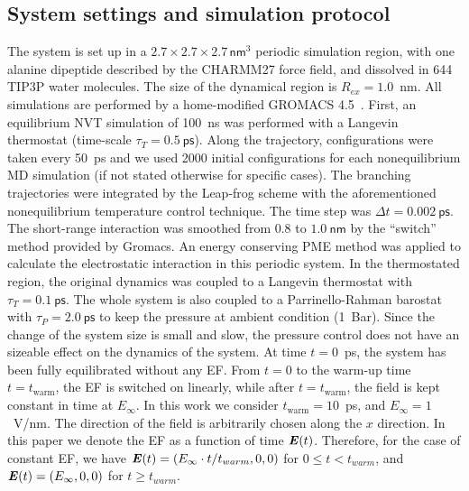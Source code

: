 \documentclass[a4paper,preprint,unsortedaddress,onecolumn]{revtex4-1}
\newcommand{\vect}[1]{\textbf{\textit{#1}}}
\begin{document}
\subsection{System settings and simulation protocol}
The system is set up in a $2.7\times 2.7\times
2.7\, \textsf{nm}^3$ periodic simulation region, with one alanine dipeptide
described by the CHARMM27 force field, and dissolved in 644 TIP3P
water molecules.
The size of the  dynamical region is $R_{ex} = 1.0$~nm.
All simulations are performed by a home-modified GROMACS 4.5~\cite{pronk2013gromacs}.
First, an equilibrium NVT simulation of
100~\textsf{ns} was performed with a Langevin thermostat (time-scale
$\tau_T = 0.5~\textsf{ps}$).  Along the trajectory, configurations were taken every
50~\textsf{ps} and we used 2000 initial configurations for each nonequilibrium
MD simulation (if not stated otherwise for specific cases).
The branching trajectories were integrated by the
Leap-frog scheme with the aforementioned nonequilibrium
temperature control technique.  The
time step was $\Delta t = 0.002~\textsf{ps}$. The short-range
interaction was smoothed from $0.8$ to $1.0~\textsf{nm}$ by the
``switch'' method provided by Gromacs.  An energy conserving PME
method was applied to calculate the electrostatic interaction in this
periodic system. In the thermostated region, the original dynamics was
coupled to a Langevin thermostat with $\tau_T = 0.1~\textsf{ps}$.
The whole system is also coupled to a Parrinello-Rahman barostat~\cite{parrinello1981polymorphic} with $\tau_P = 2.0~\textsf{ps}$ to keep
the pressure at ambient condition (1~Bar). Since the
change of the system size is small and slow, the pressure control
does not have an sizeable effect on the
dynamics of the system.
At time $t=0$~ps, the system
has been fully equilibrated without any EF. From $t=0$ to
the warm-up time $t=t_{\textrm{warm}}$, the EF is switched on linearly, while
after $t=t_{\textrm{warm}}$, the field is kept constant in time at
$E_{\infty}$.  In this work we consider $t_{\textrm{warm}} = 10$~ps,
and $E_{\infty} = 1$~V/nm.
The direction of the field is arbitrarily chosen along the
$x$ direction.
In this paper we denote the
EF as a function of time $\vect E(t)$.
Therefore, for the case of constant EF, we have
$\vect E(t) = (E_\infty\cdot t/t_{warm},0,0)$ for $0\leq t < t_{warm}$, and 
$\vect E(t) = (E_\infty,0,0)$
for $t \geq t_{warm}$.


\end{document}
